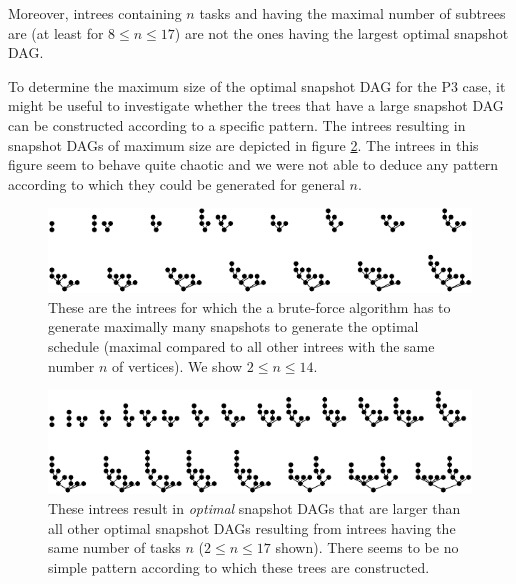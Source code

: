 Moreover, intrees containing $n$ tasks and having the maximal number of subtrees are (at least for $8\leq n \leq 17$) are not the ones having the largest optimal snapshot DAG.

To determine the maximum size of the optimal snapshot DAG for the P3 case, it might be useful to investigate whether the trees that have a large snapshot DAG can be constructed according to a specific pattern. The intrees resulting in snapshot DAGs of maximum size are depicted in figure \ref{fig:intrees-maximum-snapshot-dag-size-p3}. The intrees in this figure seem to behave quite chaotic and we were not able to deduce any pattern according to which they could be generated for general $n$.

\begin{figure}[t]
  \centering
  \includegraphics[scale=1.4]{p3/max_unoptimized.pdf}
  \caption{These are the intrees for which the a brute-force algorithm has to generate maximally many snapshots to generate the optimal schedule (maximal compared to all other intrees with the same number $n$ of vertices). We show $2\leq n \leq 14$.}
  \label{fig:intrees-maximum-unoptimized-p3}
\end{figure}

\begin{figure}[t]
  \centering
  \includegraphics[scale=1.4]{p3/max_snapshot_dag.pdf}
  \caption{These intrees result in \emph{optimal} snapshot DAGs that are larger than all other optimal snapshot DAGs resulting from intrees having the same number of tasks $n$ ($2 \leq n \leq 17$ shown). There seems to be no simple pattern according to which these trees are constructed.}
  \label{fig:intrees-maximum-snapshot-dag-size-p3}
\end{figure}


